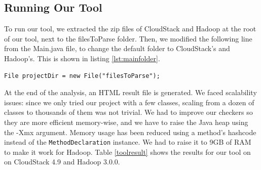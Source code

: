 \documentclass[sigconf]{acmart}
\begin{document}
\subsection{Running Our Tool}
To run our tool, we extracted the zip files of CloudStack and Hadoop at the root of our tool, next to the filesToParse folder. Then, we modified the following line from the Main.java file, to change the default folder to CloudStack's and Hadoop's. This is shown in listing \ref{lst:mainfolder}.
\begin{lstlisting}[caption={Excerpt of the \texttt{Main} class that defines the folder to parse},captionpos=b,label={lst:mainfolder}]
File projectDir = new File("filesToParse");
\end{lstlisting}
\vspace{-3mm}
At the end of the analysis, an HTML result file is generated. We faced scalability issues: since we only tried our project with a few classes, scaling from a dozen of classes to thousands of them was not trivial. We had to improve our checkers so they are more efficient memory-wise, and we have to raise the Java heap using the -Xmx argument. Memory usage has been reduced using a method's hashcode instead of the \texttt{MethodDeclaration} instance. We had to raise it to 9GB of RAM to make it work for Hadoop. Table \ref{toolresult} shows the results for our tool on on CloudStack 4.9 and Hadoop 3.0.0.
\end{document}
